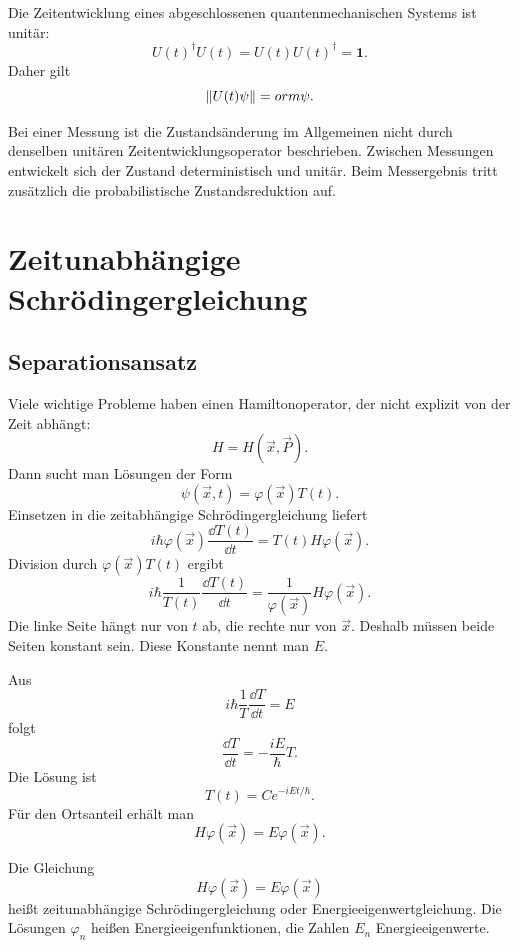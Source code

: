 \begin{formulabox}
Die Zeitentwicklung eines abgeschlossenen quantenmechanischen Systems ist unitär:
\[
    U(t)^\dagger U(t)=U(t)U(t)^\dagger=\mathbf{1}.
\]
Daher gilt
\[
    \left\lVert U(t)\psi \right\rVert=
orm{\psi}.
\]
\end{formulabox}

\begin{notebox}
Bei einer Messung ist die Zustandsänderung im Allgemeinen nicht durch denselben unitären Zeitentwicklungsoperator beschrieben. Zwischen Messungen entwickelt sich der Zustand deterministisch und unitär. Beim Messergebnis tritt zusätzlich die probabilistische Zustandsreduktion auf.
\end{notebox}

\section{Zeitunabhängige Schrödingergleichung}

\subsection{Separationsansatz}

Viele wichtige Probleme haben einen Hamiltonoperator, der nicht explizit von der Zeit abhängt:
\[
    H=H(\vec{x},\vec{P}).
\]
Dann sucht man Lösungen der Form
\[
    \psi(\vec{x},t)=\varphi(\vec{x})T(t).
\]
Einsetzen in die zeitabhängige Schrödingergleichung liefert
\[
    i\hbar\varphi(\vec{x})\frac{\dd T(t)}{\dd t}
    =T(t)H\varphi(\vec{x}).
\]
Division durch $\varphi(\vec{x})T(t)$ ergibt
\[
    i\hbar\frac{1}{T(t)}\frac{\dd T(t)}{\dd t}
    =\frac{1}{\varphi(\vec{x})}H\varphi(\vec{x}).
\]
Die linke Seite hängt nur von $t$ ab, die rechte nur von $\vec{x}$. Deshalb müssen beide Seiten konstant sein. Diese Konstante nennt man $E$.

\begin{derivationbox}
Aus
\[
    i\hbar\frac{1}{T}\frac{\dd T}{\dd t}=E
\]
folgt
\[
    \frac{\dd T}{\dd t}=-\frac{iE}{\hbar}T.
\]
Die Lösung ist
\[
    T(t)=C e^{-iEt/\hbar}.
\]
Für den Ortsanteil erhält man
\[
    H\varphi(\vec{x})=E\varphi(\vec{x}).
\]
\end{derivationbox}

\begin{definitionbox}
Die Gleichung
\[
    H\varphi(\vec{x})=E\varphi(\vec{x})
\]
heißt zeitunabhängige Schrödingergleichung oder Energieeigenwertgleichung. Die Lösungen $\varphi_n$ heißen Energieeigenfunktionen, die Zahlen $E_n$ Energieeigenwerte.
\end{definitionbox}

